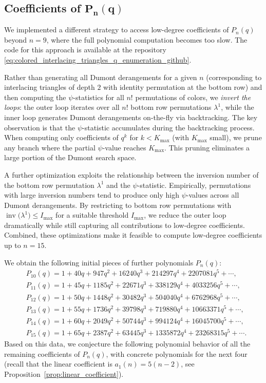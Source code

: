 \documentclass[10pt,a4paper]{amsart}
\numberwithin{equation}{section}
\theoremstyle{definition}
\begin{document}
\subsection[Coefficients of P\_n(q)]{Coefficients of $\boldsymbol{P_n(q)}$}
\label{subsec:conjectures_on_coefficients}

We implemented a different strategy to access low-degree coefficients of
$P_n(q)$ beyond $n=9$, where the full polynomial computation becomes too slow.
The code for this approach is available at the repository
\eqref{eq:colored_interlacing_triangles_q_enumeration_github}.

Rather than generating all Dumont derangements for a given $n$ (corresponding to
interlacing triangles of depth $2$ with identity permutation at the bottom row)
and then computing the $\psi$-statistics for all $n!$ permutations of colors, we
\emph{invert the loops}: the outer loop iterates over all $n!$ bottom row
permutations $\lambda^1$, while the inner loop generates Dumont derangements
on-the-fly via backtracking.
The key observation is that the $\psi$-statistic accumulates during the
backtracking process.
When computing only coefficients of $q^k$ for $k<K_{\max}$ (with $K_{\max}$
small), we prune any branch where the partial $\psi$-value reaches $K_{\max}$.
This pruning eliminates a large portion of the Dumont search space.

A further optimization exploits the relationship between the inversion number of
the bottom row permutation $\lambda^1$ and the $\psi$-statistic.
Empirically, permutations with large inversion numbers tend to produce only high
$\psi$-values across all Dumont derangements.
By restricting to bottom row permutations with
$\operatorname{inv}\bigl(\lambda^1\bigr) \leq I_{\max}$ for a suitable threshold
$I_{\max}$, we reduce the outer loop dramatically while still capturing all
contributions to low-degree coefficients.
Combined, these optimizations make it feasible to compute low-degree
coefficients up to $n = 15$.

We obtain the following initial pieces of further polynomials $P_n(q)$:
\begin{align*}
	&P_{10}(q)= 1 + 40q + 947q^2 + 16240q^3 + 214297q^4 + 2207081q^5 +\cdots,	\\
	&P_{11}(q)= 1+45q + 1185q^2 + 22671q^3 + 338129q^4 +4033256 q^5+\cdots,	\\
	&P_{12}(q)= 1 + 50q + 1448q^2 + 30482q^3 + 504040q^4 +6762968 q^5 +\cdots,	\\
	&P_{13}(q)= 1 + 55q + 1736q^2 + 39798q^3 + 719880q^4 +10663371q^5 +\cdots,	\\
	&P_{14}(q)= 1 + 60q + 2049q^2 + 50744q^3 + 994124q^4 +16045700 q^5 +\cdots,	\\
	&P_{15}(q)= 1 + 65q + 2387q^2 + 63445q^3 + 1335872q^4 + 23268315 q^5+
	\cdots.
\end{align*}
Based on this data, we conjecture the following polynomial behavior of all the
remaining coefficients of $P_n(q)$, with concrete polynomials for the next four
(recall that the linear coefficient is $a_1(n)=5(n-2)$, see
Proposition~\ref{prop:linear_coefficient}).
\end{document}
